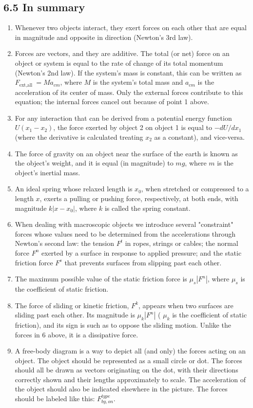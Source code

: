 \documentclass[10pt]{article}
\begin{document}
\subsection*{6.5 In summary}
\begin{enumerate}
  \item Whenever two objects interact, they exert forces on each other that are equal in magnitude and opposite in direction (Newton's 3rd law).
  \item Forces are vectors, and they are additive. The total (or net) force on an object or system is equal to the rate of change of its total momentum (Newton's 2nd law). If the system's mass is constant, this can be written as $F_{\text {ext,all }}=M a_{c m}$, where $M$ is the system's total mass and $a_{c m}$ is the acceleration of its center of mass. Only the external forces contribute to this equation; the internal forces cancel out because of point 1 above.
  \item For any interaction that can be derived from a potential energy function $U\left(x_{1}-x_{2}\right)$, the force exerted by object 2 on object 1 is equal to $-d U / d x_{1}$ (where the derivative is calculated treating $x_{2}$ as a constant), and vice-versa.
  \item The force of gravity on an object near the surface of the earth is known as the object's weight, and it is equal (in magnitude) to $m g$, where $m$ is the object's inertial mass.
  \item An ideal spring whose relaxed length is $x_{0}$, when stretched or compressed to a length $x$, exerts a pulling or pushing force, respectively, at both ends, with magnitude $k\left|x-x_{0}\right|$, where $k$ is called the spring constant.
  \item When dealing with macroscopic objects we introduce several "constraint" forces whose values need to be determined from the accelerations through Newton's second law: the tension $F^{t}$ in ropes, strings or cables; the normal force $F^{n}$ exerted by a surface in response to applied pressure; and the static friction force $F^{s}$ that prevents surfaces from slipping past each other.
  \item The maximum possible value of the static friction force is $\mu_{s}\left|F^{n}\right|$, where $\mu_{s}$ is the coefficient of static friction.
  \item The force of sliding or kinetic friction, $F^{k}$, appears when two surfaces are sliding past each other. Its magnitude is $\mu_{k}\left|F^{n}\right|$ ( $\mu_{k}$ is the coefficient of static friction), and its sign is such as to oppose the sliding motion. Unlike the forces in 6 above, it is a dissipative force.
  \item A free-body diagram is a way to depict all (and only) the forces acting on an object. The object should be represented as a small circle or dot. The forces should all be drawn as vectors originating on the dot, with their directions correctly shown and their lengths approximately to scale. The acceleration of the object should also be indicated elsewhere in the picture. The forces should be labeled like this: $F_{b y, o n}^{t y p e}$.
\end{enumerate}
\end{document}
